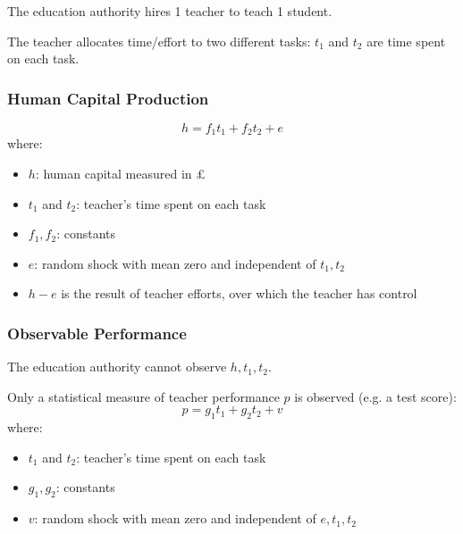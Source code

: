             The education authority hires 1 teacher to teach 1 student.
            
            The teacher allocates time/effort to two different tasks: $t_1$ and $t_2$ are time spent on each task.
        
        \subsubsection{Human Capital Production}
        
            \begin{equation*}
                h = f_1t_1 + f_2t_2 + e
            \end{equation*}
            where:
            \begin{itemize}
                \item $h$: human capital measured in \pounds
                \item $t_1$ and $t_2$: teacher's time spent on each task
                \item $f_1,f_2$: constants
                \item $e$: random shock with mean zero and independent of $t_1,t_2$
                \item $h-e$ is the result of teacher efforts, over which the teacher has control
            \end{itemize}
            
        \subsubsection{Observable Performance}
        
            The education authority cannot observe $h,t_1,t_2$.
            
            Only a statistical measure of teacher performance $p$ is observed (e.g. a test score):
            \begin{equation}
                p = g_1t_1 + g_2t_2 + v
                \label{eqn:edu_performance}
            \end{equation}
            where:
            \begin{itemize}
                \item $t_1$ and $t_2$: teacher's time spent on each task
                \item $g_1,g_2$: constants
                \item $v$: random shock with mean zero and independent of $e,t_1,t_2$
            \end{itemize}
            
